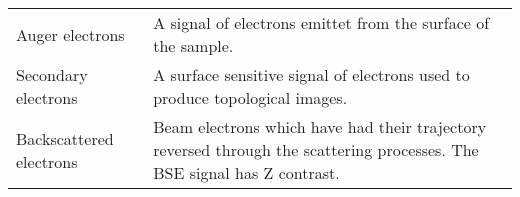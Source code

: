 \begin{table}[phb]
\begin{center}
\begin{tabular}{p{4cm}p{10.6cm}}
            Auger electrons         & A signal of electrons emittet from the surface of the sample.                                                                                                                                              \\
            Secondary electrons     & A surface sensitive signal of electrons used to produce topological images.                                                                                                                                \\
            Backscattered electrons & Beam electrons which have had their trajectory reversed through the scattering processes. The BSE signal has Z contrast.                                                                                   \\
            \hline
        \end{tabular}
    \end{center}
\end{table}